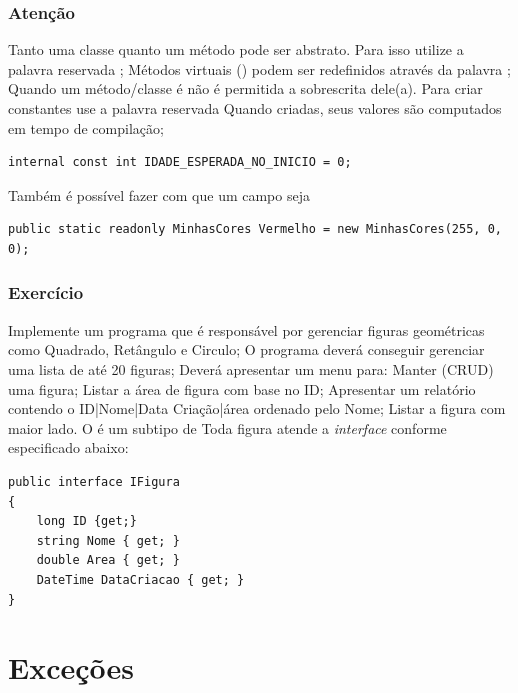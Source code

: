 \documentclass{beamer}
\begin{document}
\begin{frame}[fragile]
\frametitle{Atenção}
\begin{outline}
	\1 Tanto uma classe quanto um método pode ser abstrato. 
	\1 Para isso utilize a palavra reservada ;
	\1 Métodos virtuais () podem ser redefinidos através da palavra ;
	\1 Quando um método/classe é  não é permitida a sobrescrita dele(a).
	\1 Para criar constantes use a palavra reservada 
	\2 Quando criadas, seus valores são computados em tempo de compilação;
	\1 [] \begin{lstlisting}
internal const int IDADE_ESPERADA_NO_INICIO = 0;	
	\end{lstlisting}
	\1 Também é possível fazer com que um campo seja 
	\1 [] \begin{lstlisting}
public static readonly MinhasCores Vermelho = new MinhasCores(255, 0, 0);	
	\end{lstlisting}
\end{outline}
\end{frame}


\begin{frame}[fragile]
\frametitle{Exercício}
\begin{outline}
	\1 Implemente um programa que é responsável por gerenciar figuras geométricas como Quadrado, Retângulo e Circulo;
		\2 O programa deverá conseguir gerenciar uma lista de até 20 figuras;
		\2 Deverá apresentar um menu para:
			\3 [1.] Manter (CRUD) uma figura;
			\3 [2.] Listar a área de figura com base no ID;
			\3 [3.] Apresentar um relatório contendo o ID|Nome|Data Criação|área ordenado pelo Nome;	
			\3 [4.] Listar a figura com maior lado.		
		\2 O  é um subtipo de  		
	\1 Toda figura atende a \textit{interface}  conforme especificado abaixo:
	\1 []
\begin{lstlisting}
public interface IFigura
{
	long ID {get;}
	string Nome { get; }
	double Area { get; }
	DateTime DataCriacao { get; }
}
\end{lstlisting}
\end{outline}
\end{frame}


\section{Exceções}
\end{document}
